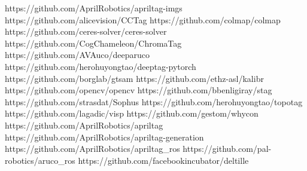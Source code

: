\newcommand{\term}[1]{\textbf{#1}}                 %
\newcommand{\eng}[1]{\emph{#1}}                    %
\newcommand{\vn}[2]{\textbf{#1} (\emph{#2})}
\newcommand{\en}[1]{\textbf{\emph{#1}}}
\newcommand{\code}[1]{\texttt{#1}}
\usepackage{xstring}
\expandafter\def\csname repourl@AprilTag-imgs\endcsname{https://github.com/AprilRobotics/apriltag-imgs}
\expandafter\def\csname repourl@CCTag\endcsname{https://github.com/alicevision/CCTag}
\expandafter\def\csname repourl@COLMAP\endcsname{https://github.com/colmap/colmap}
\expandafter\def\csname repourl@Ceres\endcsname{https://github.com/ceres-solver/ceres-solver}
\expandafter\def\csname repourl@ChromaTag\endcsname{https://github.com/CogChameleon/ChromaTag}
\expandafter\def\csname repourl@DeepArUco\endcsname{https://github.com/AVAuco/deeparuco}
\expandafter\def\csname repourl@DeepTag\endcsname{https://github.com/herohuyongtao/deeptag-pytorch}
\expandafter\def\csname repourl@GTSAM\endcsname{https://github.com/borglab/gtsam}
\expandafter\def\csname repourl@Kalibr\endcsname{https://github.com/ethz-asl/kalibr}
\expandafter\def\csname repourl@OpenCV\endcsname{https://github.com/opencv/opencv}
\expandafter\def\csname repourl@STag\endcsname{https://github.com/bbenligiray/stag}
\expandafter\def\csname repourl@Sophus\endcsname{https://github.com/strasdat/Sophus}
\expandafter\def\csname repourl@TopoTag\endcsname{https://github.com/herohuyongtao/topotag}
\expandafter\def\csname repourl@ViSP\endcsname{https://github.com/lagadic/visp}
\expandafter\def\csname repourl@WhyCon\endcsname{https://github.com/gestom/whycon}
\expandafter\def\csname repourl@apriltag\endcsname{https://github.com/AprilRobotics/apriltag}
\expandafter\def\csname repourl@apriltag-generation\endcsname{https://github.com/AprilRobotics/apriltag-generation}
\expandafter\def\csname repourl@apriltag_ros\endcsname{https://github.com/AprilRobotics/apriltag_ros}
\expandafter\def\csname repourl@aruco_ros\endcsname{https://github.com/pal-robotics/aruco_ros}
\expandafter\def\csname repourl@deltille\endcsname{https://github.com/facebookincubator/deltille}
